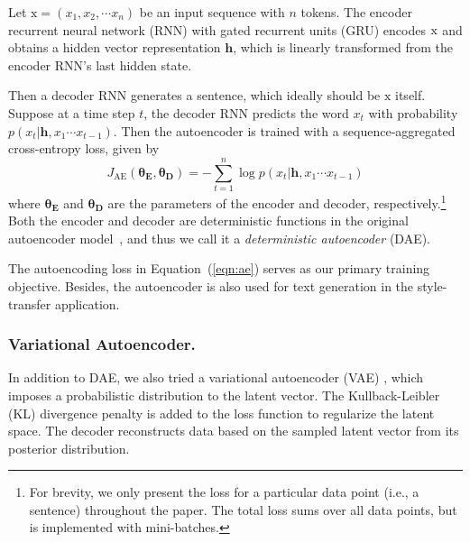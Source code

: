 \documentclass[letterpaper]{article} %
\newcommand{\rmx}{\mathrm x}
\newcommand{\loss}[1]{J_{\text{#1}}}
\newcommand{\nnweight}[1]{\bm{\theta_{\text{#1}}}}
\begin{document}
Let $\rmx=(x_1, x_2, \cdots x_n)$ be an input sequence with $n$ tokens.
The encoder recurrent neural network (RNN) with gated recurrent units (GRU) \cite{cho2014learning} encodes $\rm x$ and obtains a hidden vector representation $\bm h$, which is linearly transformed from the encoder RNN's last hidden state.

Then a decoder RNN generates a sentence, which ideally should be $\rmx$ itself.
Suppose at a time step $t$, the decoder RNN predicts the word $x_t$ with probability $p(x_t|\bm h, x_1\cdots x_{t-1})$. Then the autoencoder is trained with a sequence-aggregated cross-entropy loss, given by
\begin{equation}\label{eqn:ae}
	\loss{AE}(\nnweight{E},\nnweight{D})= -\sum_{t=1}^n \log p(x_t|\bm h, x_1\cdots x_{t-1})
\end{equation}
where $\nnweight{E}$ and $\nnweight{D}$ are the parameters of the encoder and decoder, respectively.\footnote{For brevity, we only present the loss for a particular data point (i.e., a sentence) throughout the paper. The total loss sums over all data points, but is implemented with mini-batches.} Both the encoder and decoder are deterministic functions in the original autoencoder model~\cite{rumelhart1985learning}, and thus we call it a \textit{deterministic autoencoder} (DAE).

The autoencoding loss in Equation~(\ref{eqn:ae}) serves as our primary training objective.
Besides, the autoencoder is also used for text generation in the style-transfer application.


\subsubsection{Variational Autoencoder.}

In addition to DAE, we also tried a variational autoencoder (VAE) \cite{kingma2013auto}, which imposes a probabilistic distribution to the latent vector. The Kullback-Leibler (KL) divergence \cite{kullback1951information} penalty is added to the loss function to regularize the latent space. The decoder reconstructs data based on the sampled latent vector from its posterior distribution.
\end{document}
